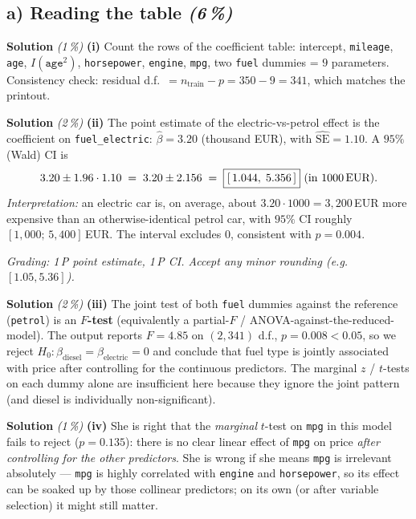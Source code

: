 \documentclass[11pt,a4paper]{article}
\newcommand{\subpoints}[1]{\textit{(#1\,\%)}}
\newcommand{\sol}{\noindent\textbf{Solution}}
\begin{document}
\subsection*{a) Reading the table \subpoints{6}}

\sol{} \subpoints{1} \textbf{(i)} Count the rows of the coefficient table: intercept, \texttt{mileage},
\texttt{age}, $I(\texttt{age}^2)$, \texttt{horsepower}, \texttt{engine}, \texttt{mpg}, two
\texttt{fuel} dummies = $\boxed{9}$ parameters. Consistency check: residual d.f.\ $=n_\text{train}-p
=350-9=341$, which matches the printout.

\medskip
\sol{} \subpoints{2} \textbf{(ii)} The point estimate of the electric-vs-petrol effect is the
coefficient on \texttt{fuel\_electric}: $\hat\beta = 3.20$ (thousand EUR), with $\widehat{\mathrm{SE}}=1.10$.
A $95\%$ (Wald) CI is
$$3.20 \pm 1.96\cdot 1.10 \;=\; 3.20\pm 2.156 \;=\; \boxed{[\,1.044,\;5.356\,]}\text{ (in $1000$\,EUR).}$$
\emph{Interpretation:} an electric car is, on average, about $3.20\cdot 1000 = 3{,}200$\,EUR more
expensive than an otherwise-identical petrol car, with $95\%$ CI roughly $[1{,}000;\,5{,}400]$\,EUR.
The interval excludes $0$, consistent with $p=0.004$.

\noindent\emph{Grading: 1\,P point estimate, 1\,P CI. Accept any minor rounding (e.g.\ $[1.05, 5.36]$).}

\medskip
\sol{} \subpoints{2} \textbf{(iii)} The joint test of both \texttt{fuel} dummies against the
reference (\texttt{petrol}) is an \textbf{$F$-test} (equivalently a partial-$F$ /
ANOVA-against-the-reduced-model). The output reports $F=4.85$ on $(2, 341)$ d.f., $p=0.008<0.05$, so
we reject $H_0: \beta_{\text{diesel}}=\beta_{\text{electric}}=0$ and conclude that fuel type is
jointly associated with price after controlling for the continuous predictors. The marginal $z$ /
$t$-tests on each dummy alone are insufficient here because they ignore the joint pattern (and
diesel is individually non-significant).

\medskip
\sol{} \subpoints{1} \textbf{(iv)} She is right that the \emph{marginal} $t$-test on \texttt{mpg}
in this model fails to reject ($p=0.135$): there is no clear linear effect of \texttt{mpg} on price
\emph{after controlling for the other predictors}. She is wrong if she means \texttt{mpg} is
irrelevant absolutely --- \texttt{mpg} is highly correlated with \texttt{engine} and
\texttt{horsepower}, so its effect can be soaked up by those collinear predictors; on its own (or
after variable selection) it might still matter.
\end{document}
